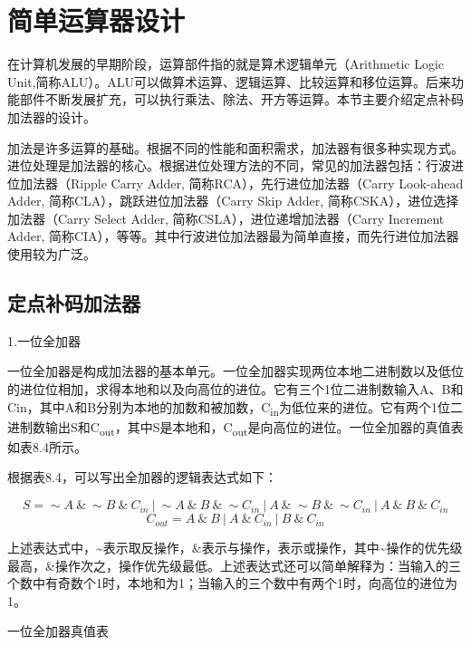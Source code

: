 \documentclass[]{ctexbook}
\begin{document}
\hypertarget{ux7b80ux5355ux8fd0ux7b97ux5668ux8bbeux8ba1}{%
\section{简单运算器设计}\label{ux7b80ux5355ux8fd0ux7b97ux5668ux8bbeux8ba1}}

在计算机发展的早期阶段，运算部件指的就是算术逻辑单元（Arithmetic Logic Unit,简称ALU）。ALU可以做算术运算、逻辑运算、比较运算和移位运算。后来功能部件不断发展扩充，可以执行乘法、除法、开方等运算。本节主要介绍定点补码加法器的设计。

加法是许多运算的基础。根据不同的性能和面积需求，加法器有很多种实现方式。进位处理是加法器的核心。根据进位处理方法的不同，常见的加法器包括：行波进位加法器（Ripple Carry Adder, 简称RCA），先行进位加法器（Carry Look-ahead Adder, 简称CLA），跳跃进位加法器（Carry Skip Adder, 简称CSKA），进位选择加法器（Carry Select Adder, 简称CSLA），进位递增加法器（Carry Increment Adder, 简称CIA），等等。其中行波进位加法器最为简单直接，而先行进位加法器使用较为广泛。

\hypertarget{ux5b9aux70b9ux8865ux7801ux52a0ux6cd5ux5668}{%
\subsection{定点补码加法器}\label{ux5b9aux70b9ux8865ux7801ux52a0ux6cd5ux5668}}

1.一位全加器

一位全加器是构成加法器的基本单元。一位全加器实现两位本地二进制数以及低位的进位位相加，求得本地和以及向高位的进位。它有三个1位二进制数输入A、B和Cin，其中A和B分别为本地的加数和被加数，C\textsubscript{in}为低位来的进位。它有两个1位二进制数输出S和C\textsubscript{out}，其中S是本地和，C\textsubscript{out}是向高位的进位。一位全加器的真值表如表8.4所示。

根据表8.4，可以写出全加器的逻辑表达式如下：

\[S=\sim A \ \& \ \sim B \ \& \ C_{in} \ | \ \sim A \ \& \ B \ \& \ \sim C_{in} \ | \ A \ \& \ \sim B \ \& \ \sim C_{in} \ | \ A \ \& \ B \ \& \ C_{in}\]
\[C_{out}=A \ \& \ B \ | \ A \ \& \ C_{in} \ | \ B \ \& \ C_{in}\]

上述表达式中，\textasciitilde 表示取反操作，\&表示与操作，\textbar 表示或操作，其中\textasciitilde 操作的优先级最高，\&操作次之，\textbar 操作优先级最低。上述表达式还可以简单解释为：当输入的三个数中有奇数个1时，本地和为1；当输入的三个数中有两个1时，向高位的进位为1。

\label{tab:fulladder-truetable}一位全加器真值表
\end{document}

